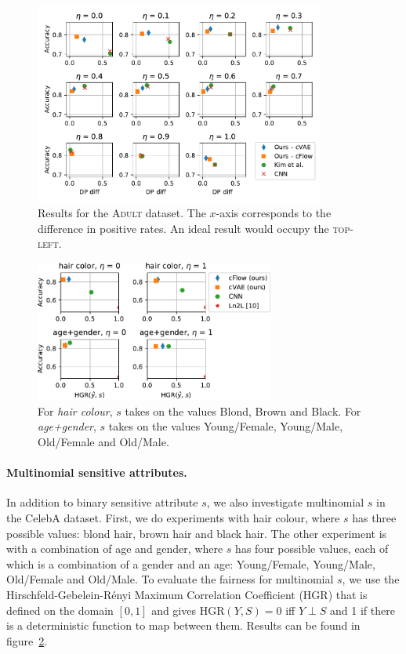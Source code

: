 \begin{figure}[htb]
  \centering
  \includegraphics[width=0.85\textwidth]{nifr/Figures/nosinn_adult_multiplot_all_landscape_diff.pdf}
  \caption{
      Results for the \textsc{Adult} dataset.
      The $x$-axis corresponds to the difference in positive rates.
      An ideal result would occupy the \textsc{top-left}.
  }%
  \label{fig:big-adult-chart}
\end{figure}
\begin{figure}[htb]
    \centering
    \includegraphics[width=0.7\textwidth]{nifr/Figures/celeba_multi_s.pdf}
    \caption{
        For \emph{hair colour}, $s$ takes on the values Blond, Brown and Black.
        For \emph{age+gender}, $s$ takes on the values Young/Female, Young/Male, Old/Female and Old/Male.
    }%
    \label{fig:multi-s}
\end{figure}

\paragraph{Multinomial sensitive attributes.}
In addition to binary sensitive attribute $s$,
we also investigate multinomial $s$ in the CelebA dataset.
First, we do experiments with hair colour, where $s$ has three possible values:
blond hair, brown hair and black hair.
The other experiment is with a combination of age and gender,
where $s$ has four possible values, each of which is a combination of a gender and an age:
Young/Female, Young/Male, Old/Female and Old/Male.
To evaluate the fairness for multinomial $s$, we use the Hirschfeld-Gebelein-R\'enyi Maximum Correlation Coefficient (HGR) \citep{mary2019fairness} that is defined on the domain $[0, 1]$ and gives $\text{HGR}(Y,S)=0$ iff $Y \perp S$
and 1 if there is a deterministic function to map between them.
Results can be found in figure~\ref{fig:multi-s}.\\

